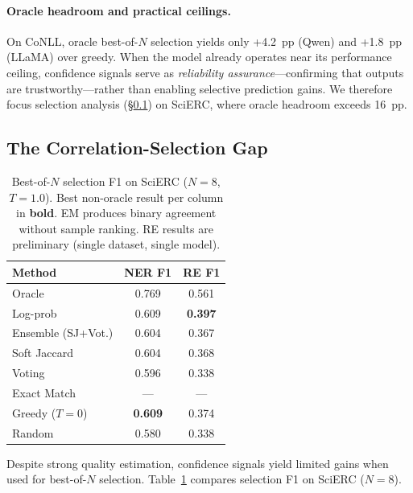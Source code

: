 \paragraph{Oracle headroom and practical ceilings.}
On CoNLL, oracle best-of-$N$ selection yields only +4.2~pp (Qwen) and +1.8~pp (LLaMA) over greedy.
When the model already operates near its performance ceiling, confidence signals serve as \textit{reliability assurance}---confirming that outputs are trustworthy---rather than enabling selective prediction gains.
We therefore focus selection analysis (\S\ref{sec:selection_gap}) on SciERC, where oracle headroom exceeds 16~pp.

\subsection{The Correlation-Selection Gap}
\label{sec:selection_gap}

\begin{table}[t]
\centering
\small
\caption{Best-of-$N$ selection F1 on SciERC ($N{=}8$, $T{=}1.0$). Best non-oracle result per column in \textbf{bold}. EM produces binary agreement without sample ranking. RE results are preliminary (single dataset, single model).}
\label{tab:selection}
\begin{tabular}{lcc}
\toprule
Method & NER F1 & RE F1 \\
\midrule
Oracle & 0.769 & 0.561 \\
\midrule
Log-prob           & 0.609 & \textbf{0.397} \\
Ensemble (SJ+Vot.) & 0.604 & 0.367 \\
Soft Jaccard       & 0.604 & 0.368 \\
Voting             & 0.596 & 0.338 \\
Exact Match        & ---   & ---   \\
\midrule
Greedy ($T{=}0$)   & \textbf{0.609} & 0.374 \\
Random             & 0.580 & 0.338 \\
\bottomrule
\end{tabular}
\end{table}

Despite strong quality estimation, confidence signals yield limited gains when used for best-of-$N$ selection.
Table~\ref{tab:selection} compares selection F1 on SciERC ($N{=}8$).

